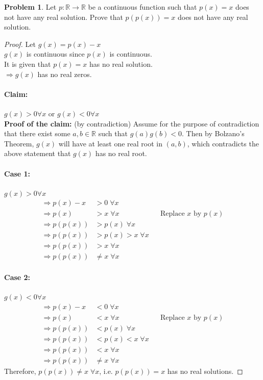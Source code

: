 \documentclass[14]{article}
\theoremstyle{definition}
\newtheorem{prob}{Problem}
\begin{document}
\begin{prob}
Let $p:\mathbb{R}\to \mathbb{R}$ be a continuous function such that $p(x) = x$ does not have any real solution. Prove that $p(p(x)) = x$ does not have any real solution.
\begin{proof}
Let $g(x) = p(x) - x$\\
$g(x)$ is continuous since $p(x)$ is continuous.\\
It is given that $p(x) = x$ has no real solution.\\
$\Rightarrow g(x)$ has no real zeros.
\paragraph{Claim: }$g(x) > 0 \forall x$ or $g(x) < 0 \forall x$\\
\textbf{Proof of the claim: }(by contradiction)
Assume for the purpose of contradiction that there exist some $a,b \in \mathbb{R}$ such that $g(a)g(b) < 0$. Then by Bolzano's Theorem, $g(x)$ will have at least one real root in $(a, b)$, which contradicts the above statement that $g(x)$ has no real root.\\
\paragraph{Case 1:} $g(x) > 0 \forall x$\\
\begin{align*}
\Rightarrow p(x) - x &> 0 \; \forall x\\
\Rightarrow p(x) &> x \; \forall x && \text{Replace } x \text{ by } p(x)\\
\Rightarrow p(p(x)) &> p(x)\; \forall x\\
\Rightarrow p(p(x)) &> p(x) > x\; \forall x\\
\Rightarrow p(p(x)) &> x \;\forall x\\
\Rightarrow p(p(x)) &\neq x \;\forall x
\end{align*}
\paragraph{Case 2:} $g(x) < 0 \forall x$\\
\begin{align*}
\Rightarrow p(x) - x &< 0 \; \forall x\\
\Rightarrow p(x) &< x \; \forall x && \text{Replace } x \text{ by } p(x)\\
\Rightarrow p(p(x)) &< p(x)\; \forall x\\
\Rightarrow p(p(x)) &< p(x) < x\; \forall x\\
\Rightarrow p(p(x)) &< x \;\forall x\\
\Rightarrow p(p(x)) &\neq x \;\forall x
\end{align*}
Therefore, $p(p(x)) \neq x \;\forall x$, i.e. $p(p(x)) = x$ has no real solutions.
\end{proof}
\end{prob}
\pagebreak
\end{document}
